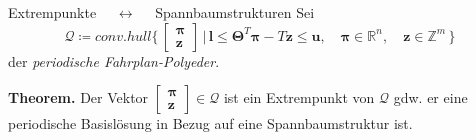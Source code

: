 \documentclass[accentcolor = tud11b, colorbacktitle, landscape, german, presentation, tudmathserif]{tudbeamer}
\newcommand{\R}{\ensuremath{\mathbb{R}}}
\newcommand{\Z}{\ensuremath{\mathbb{Z}}}
\newcommand{\mat}[1]{\boldsymbol{\mathbf{#1}}}
\renewcommand{\vec}[1]{\boldsymbol{\mathbf{#1}}}
\begin{document}
			\begin{frame}{Extrempunkte \(\quad\longleftrightarrow\quad\) Spannbaumstrukturen} %
				Sei
				\begin{equation*}
					\mathcal{Q} \coloneqq \mathit{conv.hull} \Bigg\{\, \begin{bmatrix} \vec{\pi} \\ \vec{z} \end{bmatrix} \,\bigg\vert\, \vec{l} \leq \mat{\Theta}^T \vec{\pi} - T\vec{z} \leq \vec{u}, \quad \vec{\pi} \in \R^n, \quad \vec{z} \in \Z^m \,\Bigg\}
				\end{equation*}
				der \emph{periodische Fahrplan-Polyeder}.
				
				\vspace{1cm}
				\textbf{Theorem.} Der Vektor \( \begin{bmatrix} \vec{\pi} \\ \vec{z} \end{bmatrix} \in \mathcal{Q} \) ist ein Extrempunkt von \( \mathcal{Q} \) gdw. er eine periodische Basislösung in Bezug auf eine Spannbaumstruktur ist.
			\end{frame}

		
\end{document}
